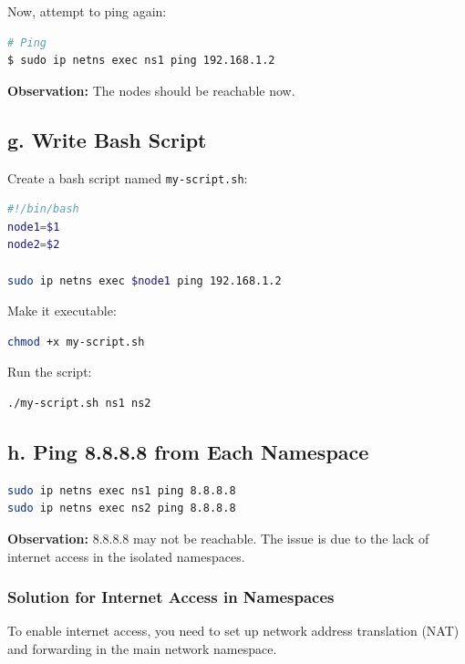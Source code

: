 \documentclass{report}
\begin{document}
Now, attempt to ping again:

\begin{lstlisting}[language=bash]
# Ping
$ sudo ip netns exec ns1 ping 192.168.1.2
\end{lstlisting}

\textbf{Observation:} The nodes should be reachable now.

\subsection*{g. Write Bash Script}

Create a bash script named \texttt{my-script.sh}:

\begin{lstlisting}[language=bash]
#!/bin/bash
node1=$1
node2=$2

sudo ip netns exec $node1 ping 192.168.1.2
\end{lstlisting}

Make it executable:

\begin{lstlisting}[language=bash]
chmod +x my-script.sh
\end{lstlisting}

Run the script:

\begin{lstlisting}[language=bash]
./my-script.sh ns1 ns2
\end{lstlisting}

\subsection*{h. Ping 8.8.8.8 from Each Namespace}

\begin{lstlisting}[language=bash]
sudo ip netns exec ns1 ping 8.8.8.8
sudo ip netns exec ns2 ping 8.8.8.8
\end{lstlisting}

\textbf{Observation:} 8.8.8.8 may not be reachable. The issue is due to the lack of internet access in the isolated namespaces.

\subsubsection*{Solution for Internet Access in Namespaces}

To enable internet access, you need to set up network address translation (NAT) and forwarding in the main network namespace.\cite{9}
\end{document}
